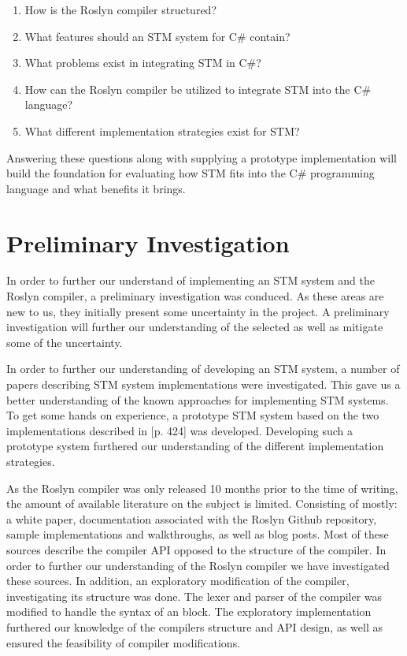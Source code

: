 \begin{enumerate}
\item How is the Roslyn compiler structured?
\item What features should an \ac{STM} system for C\# contain?
\item What problems exist in integrating \ac{STM} in C\#?
\item How can the Roslyn compiler be utilized to integrate \ac{STM} into the C\# language?
\item What different implementation strategies exist for \ac{STM}?
\end{enumerate}

Answering these questions along with supplying a prototype implementation will build the foundation for evaluating how \ac{STM} fits into the C\# programming language and what benefits it brings.
 
\section{Preliminary Investigation}
In order to further our understand of implementing an \ac{STM} system and the Roslyn compiler, a preliminary investigation was conduced. As these areas are new to us, they initially present some uncertainty in the project. A preliminary investigation will further our understanding of the selected as well as mitigate some of the uncertainty.

In order to further our understanding of developing an \ac{STM} system, a number of papers describing \ac{STM} system implementations were investigated. This gave us a better understanding of the known approaches for implementing \ac{STM} systems. To get some hands on experience, a prototype \ac{STM} system based on the two implementations described in \cite{herlihy2012art}[p. 424] was developed. Developing such a prototype system furthered our understanding of the different implementation strategies.

As the Roslyn compiler was only released 10 months prior to the time of writing, the amount of available literature on the subject is limited. Consisting of mostly: a white paper\cite{ng2012roslyn}, documentation associated with the Roslyn Github repository\cite{roslynwiki}, sample implementations and walkthroughs\cite{roslynsamples}, as well as blog posts. Most of these sources describe the compiler \ac{API} opposed to the structure of the compiler. In order to further our understanding of the Roslyn compiler we have investigated these sources. In addition, an exploratory modification of the compiler, investigating its structure was done. The lexer and parser of the compiler was modified to handle the syntax of an  block. The exploratory implementation furthered our knowledge of the compilers structure and \ac{API} design, as well as ensured the feasibility of compiler modifications.

\worksheetend